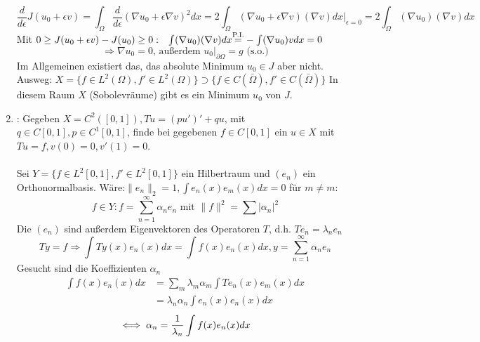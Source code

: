 \begin{enumerate}
	\[ \frac{d}{d\epsilon} J(u_{0} + \epsilon v) = \int_{\Omega} \frac{d}{d\epsilon} (\nabla u_{0} + \epsilon \nabla v)^{2} dx = 2 \int_{\Omega} (\nabla u_{0} + \epsilon \nabla v)(\nabla v) dx|_{\epsilon = 0} = 2 \int_\Omega (\nabla u_{0}) (\nabla v) dx \]
	Mit $0 \geq J(u_{0} + \epsilon v)- J(u_{0}) \geq 0: \hspace{0.25cm} \int (\nabla u_{0})(\nabla v) dx \overset{\text{P.I.}}{{=}} - \int (\nabla u_{0})v dx = 0$
	\[ \Rightarrow \nabla u_{0} = 0 \text{, au{\ss}erdem } u_{0 }|_{\partial \Omega} = g \text{ (s.o.)} \]
	Im Allgemeinen existiert das, das absolute Minimum $u_{0} \in J$ aber nicht. \\
	Ausweg: $X = \{ f \in L^{2}(\Omega), f' \in L^{2}(\Omega) \} \supset \{f \in C(\bar \Omega), f' \in C(\bar \Omega) \} $
	In diesem Raum $X$ (Sobolevräume) gibt es ein Minimum $u_{0}$ von $J$.
	\item  {}:  Gegeben $X = C^{2}([0, 1]), Tu = (pu')' + qu$, mit $q \in C[0, 1], p \in C^{1}[0, 1]$, finde bei gegebenen $f \in C[0, 1]$ ein $u \in X$ mit $Tu = f, v(0) = 0, v'(1) = 0$. \\ \\
	Sei $Y = \{ f \in L^{2}[0, 1], f' \in L^{2}[0, 1] \}$ ein Hilbertraum und $(e_{n})$ ein Orthonormalbasis. Wäre:$\| e_{n} \|_{2} = 1, \int e_{n}(x) e_{m}(x) dx = 0$ für $m \neq m$: 
		\[ f \in Y: f = \sum_{n = 1}^{\infty} \alpha_{n} e_{n} \text{ mit } \| f \|^2 = \sum | \alpha_{n} |^2 \]
	Die $(e_{n})$ sind au{\ss}erdem Eigenvektoren des Operatoren $T$, d.h. $Te_{n} = \lambda_{n} e_{n}$ \\
	\[ Ty = f \Rightarrow \int Ty(x) e_{n}(x) dx = \int f(x) e_{n}(x) dx, y = \sum_{n = 1}^{\infty} \alpha_{n} e_{n} \]
	Gesucht sind die Koeffizienten $\alpha_{n}$
	\begin{align*}
		\int f(x) e_{n}(x) dx & = \sum_{m} \lambda_{m} \alpha_{m} \int T e_{n}(x) e_{m}(x) dx \\
							  & =  \lambda_{n} \alpha_{n} \int e_{n}(x) e_{n}(x) dx
	\end{align*}
	\[ \iff \alpha_{n} = \frac{1}{\lambda_n} \int f(x) e_{n}(x) dx \]
\end{enumerate}



\newpage